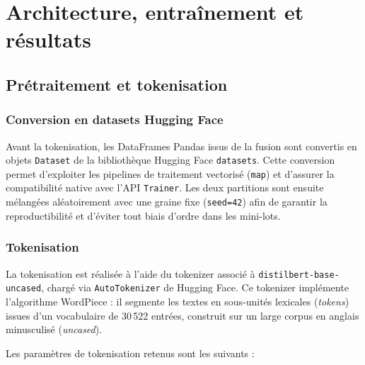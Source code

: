 ﻿\documentclass[12pt, a4paper]{report}
\begin{document}

\chapter{Architecture, entraînement et résultats}

\section{Prétraitement et tokenisation}

\subsection{Conversion en datasets Hugging Face}

Avant la tokenisation, les DataFrames Pandas issus de la fusion sont convertis
en objets \texttt{Dataset} de la bibliothèque Hugging Face \texttt{datasets}.
Cette conversion permet d'exploiter les pipelines de traitement vectorisé
(\texttt{map}) et d'assurer la compatibilité native avec l'API \texttt{Trainer}.
Les deux partitions sont ensuite mélangées aléatoirement avec une graine fixe
(\texttt{seed=42}) afin de garantir la reproductibilité et d'éviter tout biais
d'ordre dans les mini-lots.

\subsection{Tokenisation}

La tokenisation est réalisée à l'aide du tokenizer associé à
\texttt{distilbert-base-uncased}, chargé via \texttt{AutoTokenizer} de
Hugging Face. Ce tokenizer implémente l'algorithme WordPiece : il segmente
les textes en sous-unités lexicales (\textit{tokens}) issues d'un vocabulaire
de 30\,522 entrées, construit sur un large corpus en anglais minusculisé
(\textit{uncased}).

Les paramètres de tokenisation retenus sont les suivants :
\end{document}
